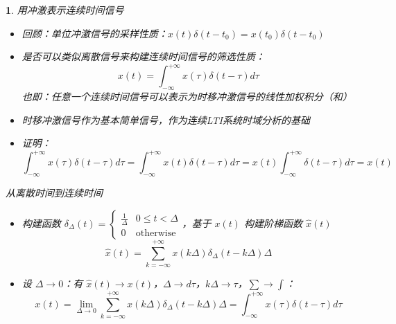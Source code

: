 \documentclass[UTF8]{report}
\theoremstyle{MyLineTheoremStyle} %
\theoremstyle{MyBlockTheoremStyle} %
\theoremstyle{MySubsubsectionStyle} %
\newtheorem{definition}{}
\begin{document}
\begin{definition}
    用冲激表示连续时间信号
    \begin{itemize}
        \item 回顾：单位冲激信号的采样性质：$x(t)\delta(t - t_0) = x(t_0)\delta(t - t_0)$
        \item 是否可以类似离散信号来构建连续时间信号的筛选性质：
        \[
        x(t) = \int_{-\infty}^{+\infty} x(\tau) \delta(t - \tau) d\tau
        \]
        也即：任意一个连续时间信号可以表示为时移冲激信号的线性加权积分（和）
        \item 时移冲激信号作为基本简单信号，作为连续LTI系统时域分析的基础
        \item 证明：
        \[
        \int_{-\infty}^{+\infty} x(\tau) \delta(t - \tau) d\tau = \int_{-\infty}^{+\infty} x(t) \delta(t - \tau) d\tau = x(t) \int_{-\infty}^{+\infty} \delta(t - \tau) d\tau = x(t)
        \]
    \end{itemize}

    从离散时间到连续时间
    \begin{itemize}
        \item 构建函数 $\delta_\Delta(t) = \begin{cases} 
        \frac{1}{\Delta} & 0 \leq t < \Delta \\
        0 & \text{otherwise} 
        \end{cases}$，基于 $x(t)$ 构建阶梯函数 $\hat{x}(t)$
        \[
        \hat{x}(t) = \sum_{k=-\infty}^{+\infty} x(k\Delta) \delta_\Delta(t - k\Delta) \Delta
        \]
        \item 设 $\Delta \rightarrow 0$：有 $\hat{x}(t) \rightarrow x(t)$，$\Delta \rightarrow d\tau$，$k\Delta \rightarrow \tau$，$\sum \rightarrow \int$：
        \[
        x(t) = \lim_{\Delta \rightarrow 0} \sum_{k=-\infty}^{+\infty} x(k\Delta) \delta_\Delta(t - k\Delta) \Delta = \int_{-\infty}^{+\infty} x(\tau) \delta(t - \tau) d\tau
        \]
    \end{itemize}


\end{definition}
\end{document}
